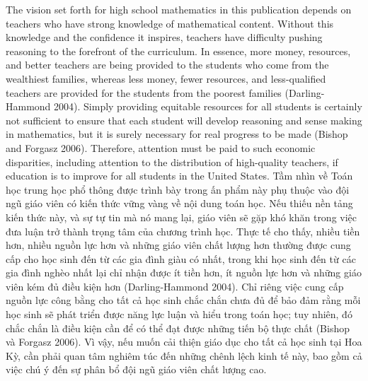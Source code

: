 \documentclass[
  10pt,
  a4paper,
  landscape,
  twoside,
  openany
]{scrbook}
\newcommand{\EN}[1]{#1}
\newcommand{\VI}[1]{#1}
\newcommand{\NOTE}[1]{#1}
\begin{document}
\TriPara
{
\EN{The vision set forth for high school mathematics in this publication depends on teachers who have strong knowledge of mathematical content. Without this knowledge and the confidence it inspires, teachers have difficulty pushing reasoning to the forefront of the curriculum. In essence, more money, resources, and better teachers are being provided to the students who come from the wealthiest families, whereas less money, fewer resources, and less-qualified teachers are provided for the students from the poorest families (Darling-Hammond 2004). Simply providing equitable resources for all students is certainly not sufficient to ensure that each student will develop reasoning and sense making in mathematics, but it is surely necessary for real progress to be made (Bishop and Forgasz 2006). Therefore, attention must be paid to such economic disparities, including attention to the distribution of high-quality teachers, if education is to improve for all students in the United States.}
}
{
\VI{Tầm nhìn về Toán học trung học phổ thông được trình bày trong ấn phẩm này phụ thuộc vào đội ngũ giáo viên có kiến thức vững vàng về nội dung toán học. Nếu thiếu nền tảng kiến thức này, và sự tự tin mà nó mang lại, giáo viên sẽ gặp khó khăn trong việc đưa luận trở thành trọng tâm của chương trình học. Thực tế cho thấy, nhiều tiền hơn, nhiều nguồn lực hơn và những giáo viên chất lượng hơn thường được cung cấp cho học sinh đến từ các gia đình giàu có nhất, trong khi học sinh đến từ các gia đình nghèo nhất lại chỉ nhận được ít tiền hơn, ít nguồn lực hơn và những giáo viên kém đủ điều kiện hơn (Darling-Hammond 2004). Chỉ riêng việc cung cấp nguồn lực công bằng cho tất cả học sinh chắc chắn chưa đủ để bảo đảm rằng mỗi học sinh sẽ phát triển được năng lực luận và hiểu trong toán học; tuy nhiên, đó chắc chắn là điều kiện cần để có thể đạt được những tiến bộ thực chất (Bishop và Forgasz 2006). Vì vậy, nếu muốn cải thiện giáo dục cho tất cả học sinh tại Hoa Kỳ, cần phải quan tâm nghiêm túc đến những chênh lệch kinh tế này, bao gồm cả việc chú ý đến sự phân bổ đội ngũ giáo viên chất lượng cao.}
}
{
\NOTE{}
}
\end{document}
